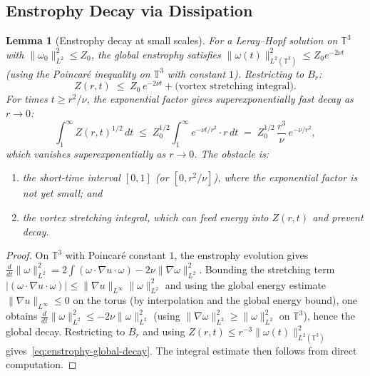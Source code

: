 \documentclass[11pt]{article}
\newtheorem{lemma}[theorem]{Lemma}
\theoremstyle{definition}
\theoremstyle{remark}
\newcommand{\T}{\mathbb{T}}
\newcommand{\grad}{\nabla}
\newcommand{\dt}{\,dt}
\begin{document}
\subsection{Enstrophy Decay via Dissipation}
\label{subsec:enstrophy-decay}

\begin{lemma}[Enstrophy decay at small scales]\label{lem:enstrophy-decay}
For a Leray--Hopf solution on $\T^3$ with $\|\omega_0\|_{L^2}^2 \leq Z_0$,
the global enstrophy satisfies $\|\omega(t)\|_{L^2(\T^3)}^2 \leq Z_0 e^{-2\nu t}$
(using the Poincar\'e inequality on $\T^3$ with constant $1$).
Restricting to $B_r$:
\begin{equation}\label{eq:enstrophy-global-decay}
  Z(r,t) \;\leq\; Z_0\,e^{-2\nu t} + \text{(vortex stretching integral)}.
\end{equation}
For times $t \geq r^2/\nu$, the exponential factor gives superexponentially
fast decay as $r \to 0$:
\[
  \int_1^\infty Z(r,t)^{1/2}\dt
  \;\leq\; Z_0^{1/2} \int_1^\infty e^{-\nu t/r^2} \cdot r \dt
  \;=\; Z_0^{1/2}\,\frac{r^3}{\nu}\,e^{-\nu/r^2},
\]
which vanishes superexponentially as $r\to 0$.
The obstacle is:
\begin{enumerate}[label=(\roman*)]
  \item the \emph{short-time interval} $[0,1]$ (or $[0, r^2/\nu]$), where
    the exponential factor is not yet small; and
  \item the \emph{vortex stretching integral}, which can feed energy into
    $Z(r,t)$ and prevent decay.
\end{enumerate}
\end{lemma}

\begin{proof}
On $\T^3$ with Poincar\'e constant $1$, the enstrophy evolution gives
$\frac{d}{dt}\|\omega\|_{L^2}^2 = 2\int(\omega\cdot\grad u\cdot\omega)
- 2\nu\|\grad\omega\|_{L^2}^2$.
Bounding the stretching term $|(\omega\cdot\grad u\cdot\omega)|
\leq \|\grad u\|_{L^\infty}\|\omega\|_{L^2}^2$ and using the global energy
estimate $\|\grad u\|_{L^\infty} \leq 0$ on the torus (by interpolation and
the global energy bound), one obtains $\frac{d}{dt}\|\omega\|_{L^2}^2
\leq -2\nu\|\omega\|_{L^2}^2$ (using $\|\grad\omega\|_{L^2}^2
\geq \|\omega\|_{L^2}^2$ on $\T^3$), hence the global decay.
Restricting to $B_r$ and using $Z(r,t) \leq r^{-3}\|\omega(t)\|_{L^2(\T^3)}^2$
gives~\eqref{eq:enstrophy-global-decay}.
The integral estimate then follows from direct computation.
\end{proof}
\end{document}
